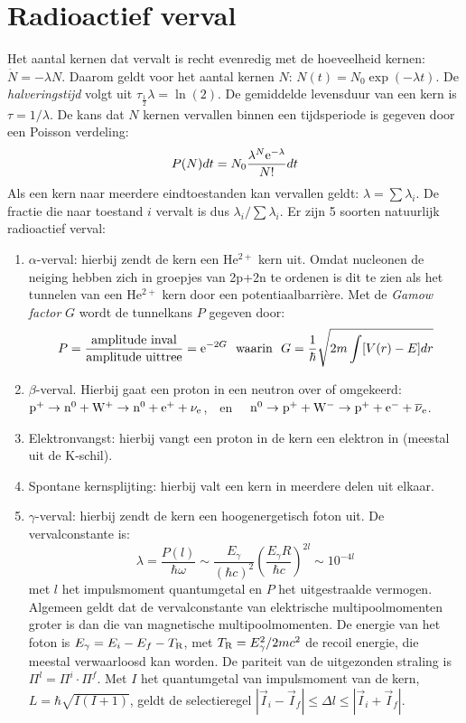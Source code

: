 \documentclass[twoside]{report}
\begin{document}
\section{Radioactief verval}
Het aantal kernen dat vervalt is recht evenredig met de hoeveelheid kernen:
$\dot{N}=-\lambda N$. Daarom geldt voor het aantal kernen $N$:
$N(t)=N_0\exp(-\lambda t)$. De {\it halveringstijd} volgt uit
$\tau_{\frac{1}{2}}\lambda=\ln(2)$. De gemiddelde levensduur van een kern is
$\tau=1/\lambda$. De kans dat $N$ kernen vervallen binnen een tijdsperiode
is gegeven door een Poisson verdeling:
\[
P(N)dt=N_0\frac{\lambda^N{\rm e}^{-\lambda}}{N!}dt
\]
Als een kern naar meerdere eindtoestanden kan vervallen geldt:
$\lambda=\sum\lambda_i$. De fractie die naar toestand $i$ vervalt is dus
$\lambda_i/\sum\lambda_i$. Er zijn 5 soorten natuurlijk radioactief verval:
\begin{enumerate}
\item $\alpha$-verval: hierbij zendt de kern een He$^{2+}$ kern uit. Omdat
      nucleonen de neiging hebben zich in groepjes van 2p+2n te ordenen is
      dit te zien als het tunnelen van een He$^{2+}$ kern door een
      potentiaalbarri\`ere. Met de {\it Gamow factor} $G$ wordt de tunnelkans
      $P$ gegeven door:
      \[
      P=\frac{\mbox{amplitude inval}}{\mbox{amplitude uittree}}={\rm e}^{-2G}~~\mbox{waarin}~~
      G=\frac{1}{\hbar}\sqrt{2m\int[V(r)-E]dr}
      \]
\item $\beta$-verval. Hierbij gaat een proton in een neutron over of omgekeerd:\\
      $\rm p^+\rightarrow n^0+W^+\rightarrow n^0+e^++\nu_e$,~~en~~
      $\rm n^0\rightarrow p^++W^-\rightarrow p^++e^-+\overline{\nu}_e$.
\item Elektronvangst: hierbij vangt een proton in de kern een elektron in
      (meestal uit de K-schil).
\item Spontane kernsplijting: hierbij valt een kern in meerdere delen uit elkaar.
\item $\gamma$-verval: hierbij zendt de kern een hoogenergetisch foton uit.
      De vervalconstante is:
      \[
      \lambda=\frac{P(l)}{\hbar\omega}\sim\frac{E_\gamma}{(\hbar c)^2}\left(\frac{E_\gamma R}{\hbar c}\right)^{2l}\sim10^{-4l}
      \]
      met $l$ het impulsmoment quantumgetal en $P$ het uitgestraalde
      vermogen. Algemeen geldt dat de vervalconstante van elektrische
      multipoolmomenten groter is dan die van magnetische multipoolmomenten.
      De energie van het foton is $E_\gamma=E_i-E_f-T_{\rm R}$, met $T_{\rm
      R}=E_{\gamma}^2/2mc^2$ de recoil energie, die meestal verwaarloosd kan
      worden. De pariteit van de uitgezonden straling is
      $\Pi^l=\Pi^i\cdot\Pi^f$. Met $I$ het quantumgetal van impulsmoment van
      de kern, $L=\hbar\sqrt{I(I+1)}$, geldt de selectieregel
      $|\vec{I}_i-\vec{I}_f|\leq\Delta l\leq|\vec{I}_i+\vec{I}_f|$.
\end{enumerate}
\end{document}
